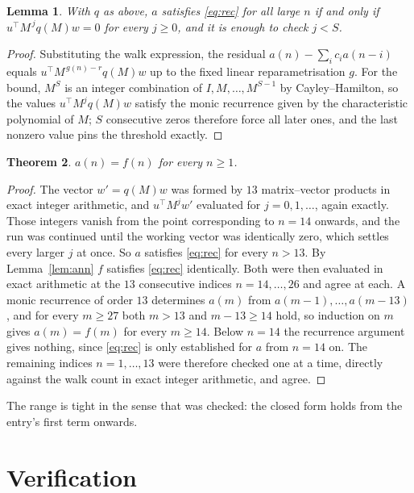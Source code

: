 \documentclass[11pt,a4paper]{article}
\theoremstyle{plain}
\newtheorem{theorem}{Theorem}
\newtheorem{lemma}[theorem]{Lemma}
\theoremstyle{definition}
\begin{document}
\begin{lemma}\label{lem:crit}
With $q$ as above, $a$ satisfies \eqref{eq:rec} for all large $n$ if and only if
$u^{\!\top}M^{\,j}q(M)w=0$ for every $j\ge0$, and it is enough to check $j<S$.
\end{lemma}

\begin{proof}
Substituting the walk expression, the residual $a(n)-\sum_ic_ia(n-i)$ equals
$u^{\!\top}M^{\,g(n)-r}q(M)w$ up to the fixed linear reparametrisation $g$. For the bound,
$M^{S}$ is an integer combination of $I,M,\dots,M^{S-1}$ by Cayley--Hamilton, so the values
$u^{\!\top}M^{j}q(M)w$ satisfy the monic recurrence given by the characteristic polynomial of
$M$; $S$ consecutive zeros therefore force all later ones, and the last nonzero value pins the
threshold exactly.
\end{proof}

\begin{theorem}
$a(n)=f(n)$ for every $n\ge1$.
\end{theorem}

\begin{proof}
The vector $w'=q(M)w$ was formed by $13$ matrix--vector products in exact integer
arithmetic, and $u^{\!\top}M^{j}w'$ evaluated for $j=0,1,\dots$, again exactly. Those integers
vanish from the point corresponding to $n=14$ onwards, and the run was continued until the
working vector was identically zero, which settles every larger $j$ at once. So $a$ satisfies
\eqref{eq:rec} for every $n>13$. By Lemma~\ref{lem:ann} $f$ satisfies \eqref{eq:rec}
identically. Both were then evaluated in exact arithmetic at the $13$ consecutive indices
$n=14,\dots,26$ and agree at each. A monic recurrence of order $13$
determines $a(m)$ from $a(m-1),\dots,a(m-13)$, and for every $m\ge27$ both
$m>13$ and $m-13\ge14$ hold, so induction on $m$ gives $a(m)=f(m)$ for every
$m\ge14$.
Below $n=14$ the recurrence argument gives nothing, since \eqref{eq:rec} is only
established for $a$ from $n=14$ on. The remaining indices $n=1,\dots,13$ were
therefore checked one at a time, directly against the walk count in exact integer arithmetic,
and agree.
\end{proof}

The range is tight in the sense that was checked: the closed form holds from the entry's first term onwards.

\section{Verification}
\end{document}
